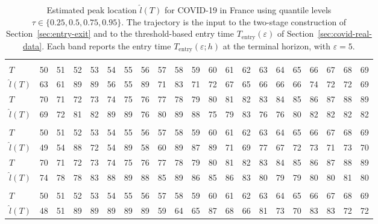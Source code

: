 \documentclass[12pt,a4paper]{article}
\begin{document}
	\begin{table}
		\caption{Estimated peak location $\hat{l}(T)$ for COVID-19 in France using quantile levels $\tau\in\{0.25,0.5,0.75,0.95\}$. The trajectory is the input to the two-stage construction of Section~\ref{sec:entry-exit} and to the threshold-based entry time $T_{\mathrm{entry}}(\varepsilon)$ of Section~\ref{sec:covid-real-data}. Each band reports the entry time $T_{\mathrm{entry}}(\varepsilon;h)$ at the terminal horizon, with $\varepsilon=5$.}
		\label{tab:france_tau}
		\begin{tabular*}{\textheight}{@{\extracolsep{\fill}}lrrrrrrrrrrrrrrrrrrrr}
			\toprule
			\addlinespace[2.5pt]
			\multicolumn{21}{c}{\textbf{$\tau=0.25,\ T_{\mathrm{entry}}(5)=85$}} \\
			\addlinespace[2.5pt]
			\midrule
			$T$ & 50 & 51 & 52 & 53 & 54 & 55 & 56 & 57 & 58 & 59 & 60 & 61 & 62 & 63 & 64 & 65 & 66 & 67 & 68 & 69 \\
			$\hat{l}(T)$ & 63 & 61 & 89 & 89 & 56 & 55 & 89 & 71 & 83 & 71 & 72 & 67 & 65 & 66 & 66 & 66 & 74 & 72 & 72 & 69 \\
			$T$ & 70 & 71 & 72 & 73 & 74 & 75 & 76 & 77 & 78 & 79 & 80 & 81 & 82 & 83 & 84 & 85 & 86 & 87 & 88 & 89 \\
			$\hat{l}(T)$ & 69 & 72 & 81 & 82 & 89 & 89 & 76 & 80 & 89 & 88 & 75 & 79 & 83 & 76 & 76 & 80 & 82 & 82 & 82 & 82 \\
			\midrule\addlinespace[2.5pt]
			\multicolumn{21}{c}{\textbf{$\tau=0.5,\ T_{\mathrm{entry}}(5)=82$}} \\
			\addlinespace[2.5pt]
			\midrule
			$T$ & 50 & 51 & 52 & 53 & 54 & 55 & 56 & 57 & 58 & 59 & 60 & 61 & 62 & 63 & 64 & 65 & 66 & 67 & 68 & 69 \\
			$\hat{l}(T)$ & 49 & 54 & 88 & 72 & 54 & 89 & 58 & 60 & 89 & 87 & 89 & 71 & 69 & 77 & 67 & 72 & 73 & 71 & 73 & 70 \\
			$T$ & 70 & 71 & 72 & 73 & 74 & 75 & 76 & 77 & 78 & 79 & 80 & 81 & 82 & 83 & 84 & 85 & 86 & 87 & 88 & 89 \\
			$\hat{l}(T)$ & 74 & 78 & 78 & 83 & 88 & 89 & 88 & 85 & 89 & 86 & 85 & 86 & 83 & 80 & 79 & 79 & 80 & 80 & 81 & 80 \\
			\midrule\addlinespace[2.5pt]
			\multicolumn{21}{c}{\textbf{$\tau=0.75,\ T_{\mathrm{entry}}(5)=80$}} \\
			\addlinespace[2.5pt]
			\midrule
			$T$ & 50 & 51 & 52 & 53 & 54 & 55 & 56 & 57 & 58 & 59 & 60 & 61 & 62 & 63 & 64 & 65 & 66 & 67 & 68 & 69 \\
			$\hat{l}(T)$ & 48 & 51 & 89 & 89 & 89 & 89 & 89 & 59 & 64 & 65 & 87 & 68 & 66 & 81 & 73 & 70 & 83 & 83 & 72 & 72 \\

\end{tabular*}
\end{table}
\end{document}
